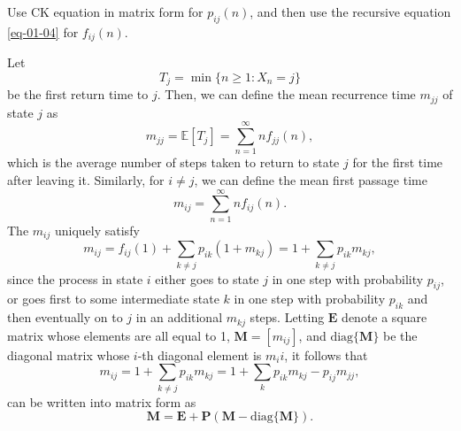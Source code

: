 \documentclass[../Note.tex]{subfiles}
\begin{document}
\begin{remark}
    Use CK equation in matrix form for $p_{ij}(n)$, and then use the recursive equation \eqref{eq-01-04} for $f_{ij}(n)$.
\end{remark}

Let 
\[
    T_j = \min\{n \geq 1: X_n = j\}
\]
be the first return time to $j$. Then, we can define the mean recurrence time $m_{jj}$ of state $j$ as 
\begin{equation}
    m_{jj} = \mathbb{E}[T_j] = \sum_{n = 1}^{\infty} n f_{jj}(n),
\end{equation} 
which is the average number of steps taken to return to state $j$ for the first time after leaving it. Similarly, for $i \ne j$, we can define the mean first passage time
\begin{equation}
    m_{ij} = \sum_{n = 1}^{\infty} n f_{ij}(n).
\end{equation} 
The $m_{ij}$ uniquely satisfy
\begin{equation}
    m_{ij} = f_{ij}(1) + \sum_{k \ne j} p_{ik} (1 + m_{kj}) = 1 + \sum_{k \ne j}p_{ik}m_{kj},
\end{equation} 
since the process in state $i$ either goes to state $j$ in one step with probability $p_{ij}$, or goes first to some intermediate state $k$ in one step with probability $p_{ik}$ and then eventually on to $j$ in an additional $m_{kj}$ steps. Letting $\mathbf{E}$ denote a square matrix whose elements are all equal to 1, $\mathbf{M} = [m_{ij}]$, and $\mathrm{diag}\{\mathbf{M}\}$ be the diagonal matrix whose $i$-th diagonal element is $m_ii$, it follows that 
\[
    m_{ij} = 1 + \sum_{k \ne j}p_{ik}m_{kj} = 1 + \sum_{k}p_{ik}m_{kj} - p_{ij}m_{jj},
\]
can be written into matrix form as
\begin{equation}
    \label{eq-1-15}
    \mathbf{M} = \mathbf{E} + \mathbf{P}(\mathbf{M} - \mathrm{diag}\{\mathbf{M}\}).
\end{equation}
\end{document}

